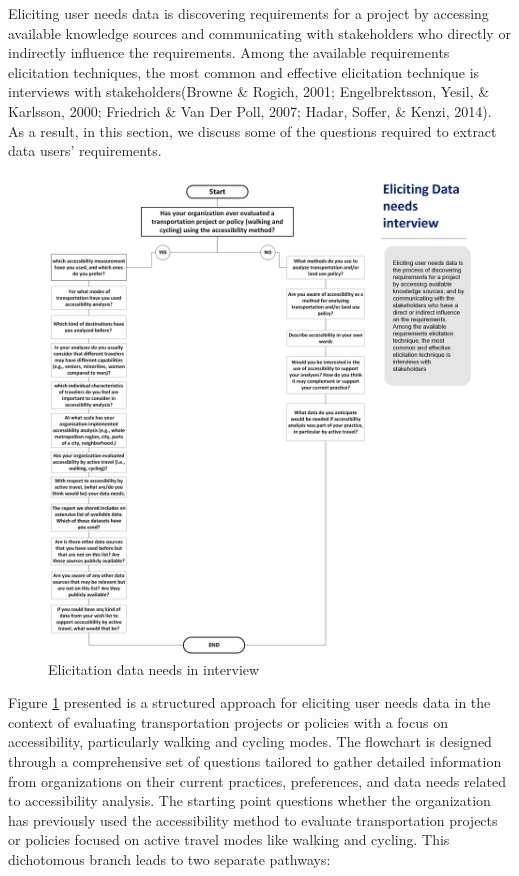 \documentclass[12pt,twoside]{reedthesis}
\begin{document}
Eliciting user needs data is discovering requirements for a project by accessing available knowledge sources and communicating with stakeholders who directly or indirectly influence the requirements. Among the available requirements elicitation techniques, the most common and effective elicitation technique is interviews with stakeholders(Browne \& Rogich, 2001; Engelbrektsson, Yesil, \& Karlsson, 2000; Friedrich \& Van Der Poll, 2007; Hadar, Soffer, \& Kenzi, 2014). As a result, in this section, we discuss some of the questions required to extract data users' requirements.
\begin{figure}

{\centering \includegraphics[width=0.9\linewidth]{fig.4} 

}

\caption{Elicitation data needs in interview}\label{fig:Flowchart}
\end{figure}
Figure \ref{fig:Flowchart} presented is a structured approach for eliciting user needs data in the context of evaluating transportation projects or policies with a focus on accessibility, particularly walking and cycling modes. The flowchart is designed through a comprehensive set of questions tailored to gather detailed information from organizations on their current practices, preferences, and data needs related to accessibility analysis. The starting point questions whether the organization has previously used the accessibility method to evaluate transportation projects or policies focused on active travel modes like walking and cycling. This dichotomous branch leads to two separate pathways:
\end{document}
